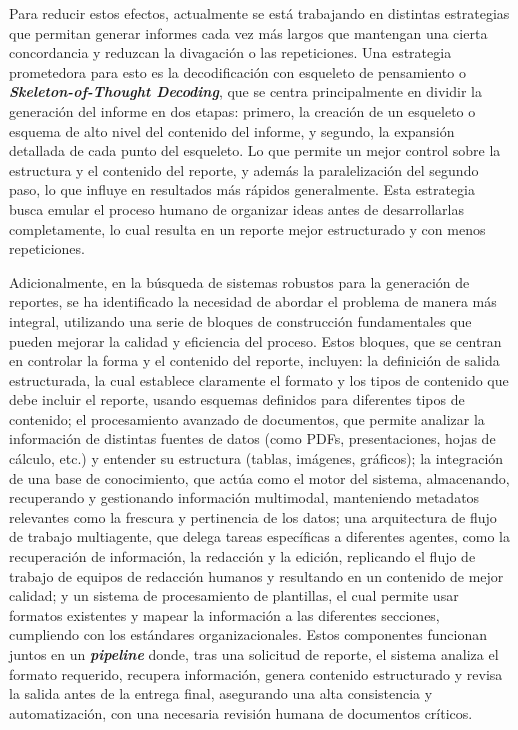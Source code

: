 Para reducir estos efectos, actualmente se está trabajando en distintas estrategias que permitan generar informes cada vez más largos que mantengan una cierta concordancia y reduzcan la divagación o las repeticiones. Una estrategia prometedora para esto es la decodificación con esqueleto de pensamiento o \textit{\textbf{Skeleton-of-Thought Decoding}}, que se centra principalmente en dividir la generación del informe en dos etapas: primero, la creación de un esqueleto o esquema de alto nivel del contenido del informe, y segundo, la expansión detallada de cada punto del esqueleto. Lo que permite un mejor control sobre la estructura y el contenido del reporte, y además la paralelización del segundo paso, lo que influye en resultados más rápidos generalmente. Esta estrategia busca emular el proceso humano de organizar ideas antes de desarrollarlas completamente, lo cual resulta en un reporte mejor estructurado y con menos repeticiones.

Adicionalmente, en la búsqueda de sistemas robustos para la generación de reportes, se ha identificado la necesidad de abordar el problema de manera más integral, utilizando una serie de bloques de construcción fundamentales que pueden mejorar la calidad y eficiencia del proceso. Estos bloques, que se centran en controlar la forma y el contenido del reporte, incluyen: la definición de salida estructurada, la cual establece claramente el formato y los tipos de contenido que debe incluir el reporte, usando esquemas definidos para diferentes tipos de contenido; el procesamiento avanzado de documentos, que permite analizar la información de distintas fuentes de datos (como PDFs, presentaciones, hojas de cálculo, etc.) y entender su estructura (tablas, imágenes, gráficos); la integración de una base de conocimiento, que actúa como el motor del sistema, almacenando, recuperando y gestionando información multimodal, manteniendo metadatos relevantes como la frescura y pertinencia de los datos; una arquitectura de flujo de trabajo multiagente, que delega tareas específicas a diferentes agentes, como la recuperación de información, la redacción y la edición, replicando el flujo de trabajo de equipos de redacción humanos y resultando en un contenido de mejor calidad; y un sistema de procesamiento de plantillas, el cual permite usar formatos existentes y mapear la información a las diferentes secciones, cumpliendo con los estándares organizacionales. Estos componentes funcionan juntos en un \textit{\textbf{pipeline}} donde, tras una solicitud de reporte, el sistema analiza el formato requerido, recupera información, genera contenido estructurado y revisa la salida antes de la entrega final, asegurando una alta consistencia y automatización, con una necesaria revisión humana de documentos críticos.

